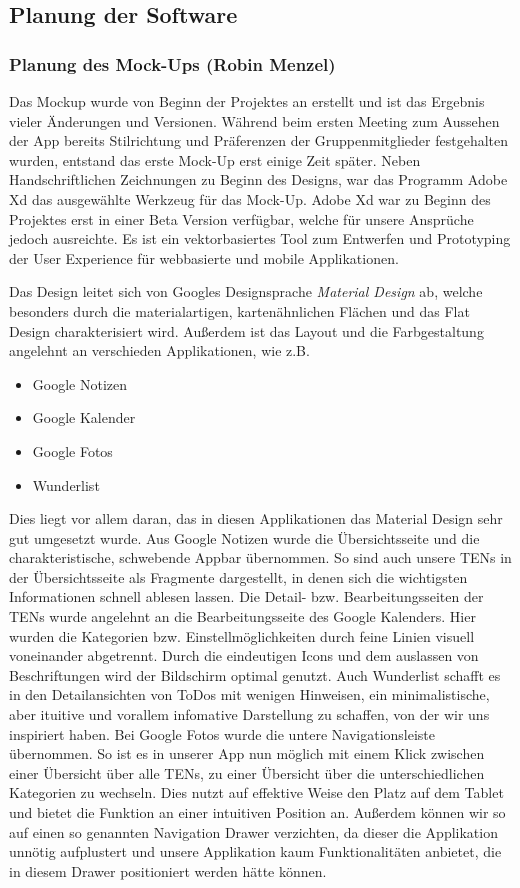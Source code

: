 \newpage
\subsection{Planung der Software}
\subsubsection{Planung des Mock-Ups (Robin Menzel)}
Das Mockup wurde von Beginn der Projektes an erstellt und ist das Ergebnis vieler Änderungen und Versionen. Während beim ersten Meeting zum Aussehen der App bereits Stilrichtung und Präferenzen der Gruppenmitglieder festgehalten wurden, entstand das erste Mock-Up erst einige Zeit später. Neben Handschriftlichen Zeichnungen zu Beginn des Designs, war das Programm Adobe Xd das ausgewählte Werkzeug für das Mock-Up. Adobe Xd war zu Beginn des Projektes erst in einer Beta Version verfügbar, welche für unsere Ansprüche jedoch ausreichte. Es ist ein vektorbasiertes Tool zum Entwerfen und Prototyping der User Experience für webbasierte und mobile Applikationen.

Das Design leitet sich von Googles Designsprache \textit{Material Design} ab, welche besonders durch die materialartigen, kartenähnlichen Flächen und das Flat Design charakterisiert wird. Außerdem ist das Layout und die Farbgestaltung angelehnt an verschieden Applikationen, wie z.B.
\begin{itemize}
\item Google Notizen
\item Google Kalender
\item Google Fotos
\item Wunderlist
\end{itemize}
Dies liegt vor allem daran, das in diesen Applikationen das Material Design sehr gut umgesetzt wurde. Aus Google Notizen wurde die Übersichtsseite und die charakteristische, schwebende Appbar übernommen. So sind auch unsere TENs in der Übersichtsseite als Fragmente dargestellt, in denen sich die wichtigsten Informationen schnell ablesen lassen. Die Detail- bzw. Bearbeitungsseiten der TENs wurde angelehnt an die Bearbeitungsseite des Google Kalenders. Hier wurden die Kategorien bzw. Einstellmöglichkeiten durch feine Linien visuell voneinander abgetrennt. Durch die eindeutigen Icons und dem auslassen von Beschriftungen wird der Bildschirm optimal genutzt. Auch Wunderlist schafft es in den Detailansichten von ToDos mit wenigen Hinweisen, ein minimalistische, aber ituitive und vorallem infomative Darstellung zu schaffen, von der wir uns inspiriert haben. Bei Google Fotos wurde die untere Navigationsleiste übernommen. So ist es in unserer App nun möglich mit einem Klick zwischen einer Übersicht über alle TENs, zu einer Übersicht über die unterschiedlichen Kategorien zu wechseln. Dies nutzt auf effektive Weise den Platz auf dem Tablet und bietet die Funktion an einer intuitiven Position an. Außerdem können wir so auf einen so genannten Navigation Drawer verzichten, da dieser die Applikation unnötig aufplustert und unsere Applikation kaum Funktionalitäten anbietet, die in diesem Drawer positioniert werden hätte können.

